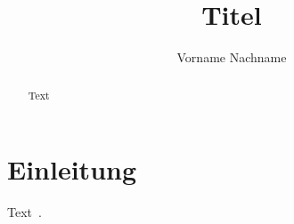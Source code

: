 \documentclass[biblatex]{lni}
\begin{document}
\title{Titel}
\author{Vorname Nachname}
\maketitle
\begin{abstract}
Text
\end{abstract}
\section{Einleitung}
Text~\cite{jabref}.
\printbibliography
\end{document}
